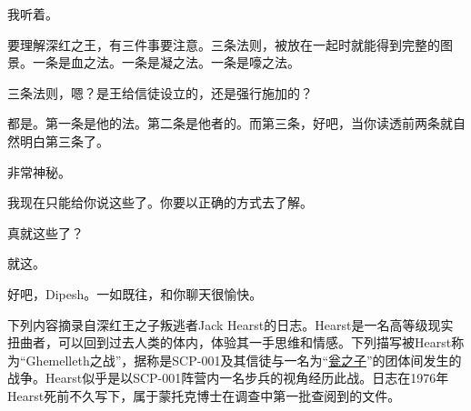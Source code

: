 \begin{scpbox}
我听着。

要理解深红之王，有三件事要注意。三条法则，被放在一起时就能得到完整的图景。一条是血之法。一条是凝之法。一条是嚎之法。

三条法则，嗯？是王给信徒设立的，还是强行施加的？

都是。第一条是他的法。第二条是他者的。而第三条，好吧，当你读透前两条就自然明白第三条了。

非常神秘。

我现在只能给你说这些了。你要以正确的方式去了解。

真就这些了？

就这。


好吧，Dipesh。一如既往，和你聊天很愉快。


\end{scpbox}

\hr

下列内容摘录自深红王之子叛逃者Jack Hearst的日志。Hearst是一名高等级现实扭曲者，可以回到过去人类的体内，体验其一手思维和情感。下列描写被Hearst称为“Ghemelleth之战”，据称是SCP-001及其信徒与一名为“\hyperref[chap:SCP-3838]{瓮之子}”的团体间发生的战争。Hearst似乎是以SCP-001阵营内一名步兵的视角经历此战。日志在1976年Hearst死前不久写下，属于蒙托克博士在调查中第一批查阅到的文件。

